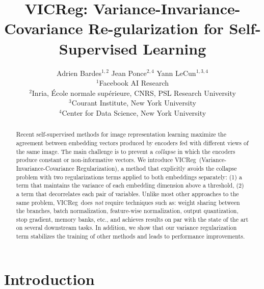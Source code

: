 \documentclass{article}
\title{VICReg: Variance-Invariance-Covariance
Re-gularization for Self-Supervised Learning}
\author{
    Adrien Bardes$^{1,2}$ \And Jean Ponce$^{2,4}$ \And Yann LeCun$^{1,3,4}$ \AND
    \begin{tabular}{l}
        $^1$\normalfont Facebook AI Research\\
        $^2$\normalfont Inria, École normale supérieure, CNRS, PSL Research University \\
        $^3$\normalfont Courant Institute, New York University\\
        $^4$\normalfont Center for Data Science, New York University\\
    \end{tabular}
}
\newcommand{\algo}{VICReg}
\begin{document}
\maketitle

\begin{abstract}
Recent self-supervised methods for image representation learning maximize the agreement between embedding vectors produced by encoders fed with different views of the same image. The main challenge is to prevent a {\em collapse} in which the encoders produce constant or non-informative vectors. We introduce \algo \ (Variance-Invariance-Covariance Regularization), a method that explicitly avoids the collapse problem with two regularizations terms applied to both embeddings separately: (1) a term that maintains the variance of each embedding dimension above a threshold, (2) a term that decorrelates each pair of variables. Unlike most other approaches to the same problem, \algo \ does {\em not} require techniques such as: weight sharing between the branches, batch normalization, feature-wise normalization, output quantization, stop gradient, memory banks, etc., and achieves results on par with the state of the art on several downstream tasks. In addition, we show that our variance regularization term stabilizes the training of other methods and leads to performance improvements.
\end{abstract}

\newcommand\blfootnote[1]{\begingroup
  \renewcommand\thefootnote{}\footnotetext{#1}\endgroup
}


\section{Introduction}
\end{document}
